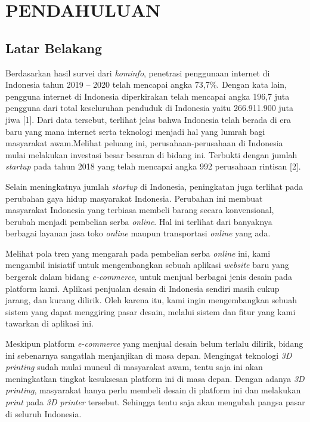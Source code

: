 \chapter{PENDAHULUAN}
\section{Latar Belakang}
Berdasarkan hasil survei dari \textit{kominfo}, penetrasi penggunaan internet di Indonesia tahun 2019 – 2020 telah mencapai angka 73,7\%. Dengan kata lain, pengguna internet di Indonesia diperkirakan telah mencapai angka 196,7 juta pengguna dari total keseluruhan penduduk di Indonesia yaitu 266.911.900 juta jiwa [1]. Dari data tersebut, terlihat jelas bahwa Indonesia telah berada di era baru yang mana internet serta teknologi menjadi hal yang lumrah bagi masyarakat awam.Melihat peluang ini, perusahaan-perusahaan di Indonesia mulai melakukan investasi besar besaran di bidang ini. Terbukti dengan jumlah \textit{startup} pada tahun 2018 yang telah mencapai angka 992 perusahaan rintisan [2].
\par
Selain meningkatnya jumlah \textit{startup} di Indonesia, peningkatan juga terlihat pada perubahan gaya hidup masyarakat Indonesia. Perubahan ini membuat masyarakat Indonesia yang terbiasa membeli barang secara konvensional, berubah menjadi pembelian serba \textit{online}. Hal ini terlihat dari banyaknya berbagai layanan jasa toko \textit{online} maupun transportasi \textit{online} yang ada. 
\par
Melihat pola tren yang mengarah pada pembelian serba \textit{online} ini, kami mengambil inisiatif untuk mengembangkan sebuah aplikasi \textit{website} baru yang bergerak dalam bidang \textit{e-commerce}, untuk menjual berbagai jenis desain pada platform kami. Aplikasi penjualan desain di Indonesia sendiri masih cukup jarang, dan kurang dilirik. Oleh karena itu, kami ingin mengembangkan sebuah sistem yang dapat menggiring pasar desain, melalui sistem dan fitur yang kami tawarkan di aplikasi ini.
\par
Meskipun platform \textit{e-commerce} yang menjual desain belum terlalu dilirik, bidang ini sebenarnya sangatlah menjanjikan di masa depan. Mengingat teknologi \textit{3D printing} sudah mulai muncul di masyarakat awam, tentu saja ini akan meningkatkan tingkat kesuksesan platform ini di masa depan. Dengan adanya \textit{3D printing}, masyarakat hanya perlu membeli desain di platform ini dan melakukan \textit{print} pada \textit{3D printer} tersebut. Sehingga tentu saja akan mengubah pangsa pasar di seluruh Indonesia.
